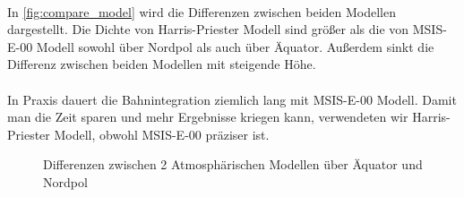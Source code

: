 \documentclass{article}
\begin{document}
\\
In \autoref{fig:compare_model} wird die Differenzen zwischen beiden Modellen dargestellt. Die Dichte von Harris-Priester Modell sind größer als die von MSIS-E-00 Modell sowohl über Nordpol als auch über Äquator. Außerdem sinkt die Differenz zwischen beiden Modellen mit steigende Höhe.
\\\\
In Praxis dauert die Bahnintegration ziemlich lang mit MSIS-E-00 Modell. Damit man die Zeit sparen und mehr Ergebnisse kriegen kann, verwendeten wir Harris-Priester Modell, obwohl MSIS-E-00 präziser ist.
\begin{figure}[ht]\centering 
	\caption{Differenzen zwischen 2 Atmosphärischen Modellen über Äquator und Nordpol}
	\label{fig:compare_model}
\end{figure}
\end{document}
